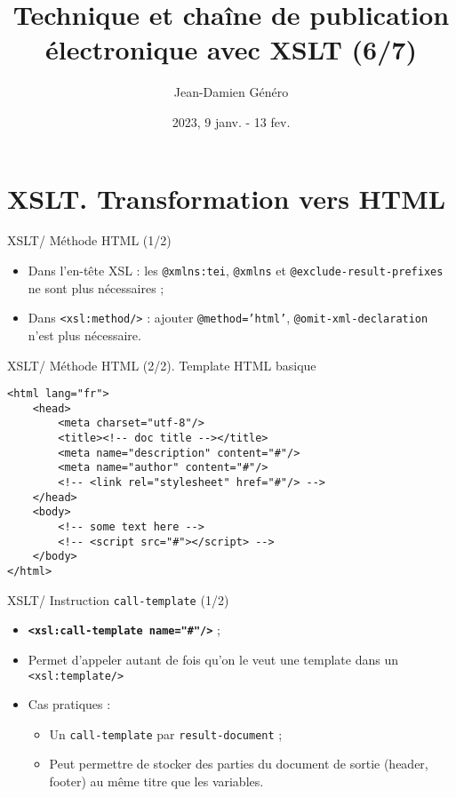 \documentclass{beamer}
\title{Technique et chaîne de publication électronique avec XSLT (6/7)}
\date{2023, 9 janv. - 13 fev.}
\author{Jean-Damien Généro}
\institute{École nationale des chartes -- M2 TNAH}
\begin{document}
    \maketitle

    \section{XSLT. Transformation vers HTML}

    \begin{frame}{XSLT/ Méthode HTML (1/2)}
        \Large
        \begin{itemize}
            \item Dans l'en-tête XSL : les \texttt{@xmlns:tei}, \texttt{@xmlns} et \texttt{@exclude-result-prefixes} ne sont plus nécessaires ;
            \bigskip
            \item Dans \texttt{<xsl:method/>} : ajouter \texttt{@method='html'}, \texttt{@omit-xml-declaration} n'est plus nécessaire.
        \end{itemize}
    \end{frame}

    \begin{frame}[fragile]{XSLT/ Méthode HTML (2/2). Template HTML basique}
        \begin{verbatim}
<html lang="fr">
    <head>
        <meta charset="utf-8"/>
        <title><!-- doc title --></title>
        <meta name="description" content="#"/>
        <meta name="author" content="#"/>
        <!-- <link rel="stylesheet" href="#"/> -->
    </head>
    <body>
        <!-- some text here -->
        <!-- <script src="#"></script> -->
    </body>
</html>
        \end{verbatim}
    \end{frame}
    
    \begin{frame}{XSLT/ Instruction \texttt{call-template} (1/2)}
        \Large
        \begin{itemize}
            \item \textbf{\texttt{<xsl:call-template name="\#"/>}} ;
            \item Permet d'appeler autant de fois qu'on le veut une template dans un \texttt{<xsl:template/>}
            \item Cas pratiques :
            \begin{itemize}
                \item Un \texttt{call-template} par \texttt{result-document} ;
                \item Peut permettre de stocker des parties du document de sortie (header, footer) au même titre que les variables.
            \end{itemize}
        \end{itemize}
    \end{frame}
\end{document}
